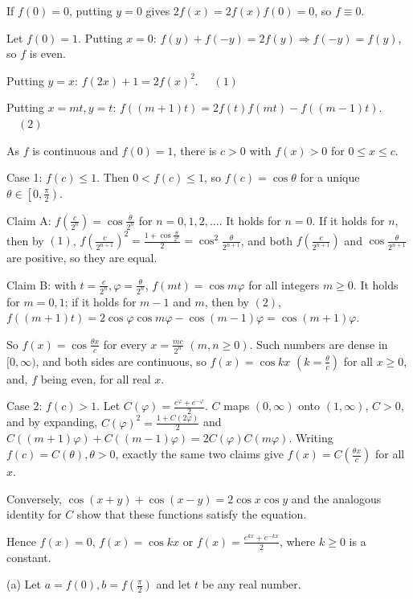   If $f(0) = 0$, putting $y = 0$ gives $2f(x) = 2f(x)f(0) = 0$, so $f\equiv 0$.

  Let $f(0) = 1$. Putting $x = 0$: $f(y) + f(-y) = 2f(y)\Rightarrow f(-y) = f(y)$, so $f$ is even.

  Putting $y = x$: $f(2x) + 1 = 2f(x)^2$. $\quad (1)$

  Putting $x = mt, y = t$: $f((m + 1)t) = 2f(t)f(mt) - f((m - 1)t)$. $\quad (2)$

  As $f$ is continuous and $f(0) = 1$, there is $c > 0$ with $f(x) > 0$ for $0\le x\le c$.

  Case 1: $f(c)\le 1$. Then $0 < f(c)\le 1$, so $f(c) = \cos\theta$ for a unique $\theta\in\left[0,
  \frac{\pi}{2}\right)$.

  Claim A: $f\left(\frac{c}{2^n}\right) = \cos\frac{\theta}{2^n}$ for $n = 0, 1, 2, \ldots$. It holds for $n = 0$. If
  it holds for $n$, then by $(1)$, $f\left(\frac{c}{2^{n + 1}}\right)^2 = \frac{1 + \cos\frac{\theta}{2^n}}{2} =
  \cos^2\frac{\theta}{2^{n + 1}}$, and both $f\left(\frac{c}{2^{n + 1}}\right)$ and $\cos\frac{\theta}{2^{n + 1}}$ are
  positive, so they are equal.

  Claim B: with $t = \frac{c}{2^n}, \varphi = \frac{\theta}{2^n}$, $f(mt) = \cos m\varphi$ for all integers $m\ge 0$.
  It holds for $m = 0, 1$; if it holds for $m - 1$ and $m$, then by $(2)$, $f((m + 1)t) = 2\cos\varphi\cos m\varphi -
  \cos(m - 1)\varphi = \cos(m + 1)\varphi$.

  So $f(x) = \cos\frac{\theta x}{c}$ for every $x = \frac{mc}{2^n}$ $(m, n\ge 0)$. Such numbers are dense in $[0,
  \infty)$, and both sides are continuous, so $f(x) = \cos kx$ $\left(k = \frac{\theta}{c}\right)$ for all $x\ge 0$,
  and, $f$ being even, for all real $x$.

  Case 2: $f(c) > 1$. Let $C(\varphi) = \frac{e^\varphi + e^{-\varphi}}{2}$. $C$ maps $(0, \infty)$ onto $(1,
  \infty)$, $C > 0$, and by expanding, $C(\varphi)^2 = \frac{1 + C(2\varphi)}{2}$ and $C((m + 1)\varphi) + C((m -
  1)\varphi) = 2C(\varphi)C(m\varphi)$. Writing $f(c) = C(\theta), \theta > 0$, exactly the same two claims give
  $f(x) = C\left(\frac{\theta x}{c}\right)$ for all $x$.

  Conversely, $\cos(x + y) + \cos(x - y) = 2\cos x\cos y$ and the analogous identity for $C$ show that these
  functions satisfy the equation.

  Hence $f(x) = 0$, $f(x) = \cos kx$ or $f(x) = \frac{e^{kx} + e^{-kx}}{2}$, where $k\ge 0$ is a constant.
\item (a) Let $a = f(0), b = f\left(\frac{\pi}{2}\right)$ and let $t$ be any real number.

